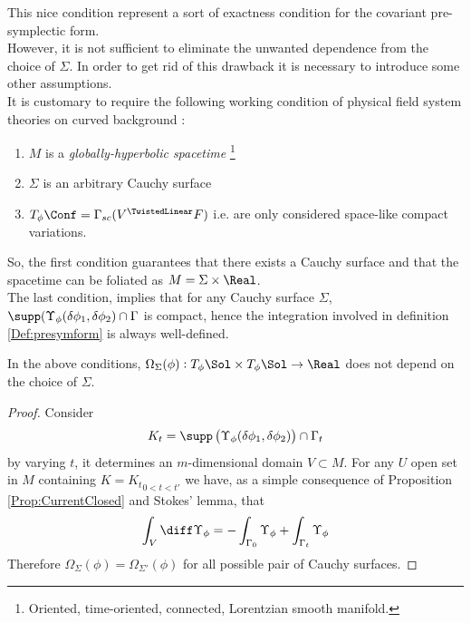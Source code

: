 \documentclass[a4paper,12pt,fleqn]{scrartcl}  %
\begin{document}
This nice condition represent a sort of exactness condition for the covariant pre-symplectic form.\\
However, it is not sufficient to eliminate the unwanted dependence from the choice of $\Sigma$.
In order to get rid of this drawback it is necessary to introduce some other assumptions.\\
It is customary to require the following working condition of physical field system theories on curved background
\cite{primer}:
\begin{enumerate}
	\item $M$ is a \emph{globally-hyperbolic spacetime}
	\footnote{Oriented, time-oriented, connected, Lorentzian smooth manifold. } 
	\item $\Sigma$ is an arbitrary Cauchy surface
	\item $T_\phi \Conf =\Gamma_{sc} (V^\TwistedLinear F )$ i.e. are only considered space-like compact variations.
\end{enumerate}
%
So, the first condition guarantees that there exists a Cauchy surface and that the spacetime can be foliated as $M= \Sigma \times \Real$.\\
The last condition, implies that for any Cauchy surface $\Sigma$, $ \supp(\Upsilon_\phi (\delta \phi_1, \delta \phi_2) \cap \Gamma$ is compact, hence the integration involved in definition \ref{Def:presymform} is always well-defined.

\begin{proposition}
	In the above conditions, $\Omega_\Sigma (\phi): T_\phi \Sol \times T_\phi \Sol \rightarrow \Real$ does not depend on the choice of $\Sigma$.
\end{proposition}
\begin{proof}
	Consider 
	\begin{displaymath}
		K_t = \supp\left(\Upsilon_\phi (\delta \phi_1, \delta \phi_2) \right) \cap \Gamma_t
	\end{displaymath}
	by varying $t$, it determines an $m$-dimensional domain $V \subset M$.
	For any $U$ open set in $M$ containing $K={K_t}_{0<t<t'}$ we have, as a simple consequence of Proposition \ref{Prop:CurrentClosed} and Stokes' lemma, that
	\begin{displaymath}
		\int_V \diff \Upsilon_\phi = - \int_{\Gamma_0} \Upsilon_\phi +\int_{\Gamma_t} \Upsilon_\phi 
	\end{displaymath}
	Therefore $\Omega_\Sigma (\phi) = \Omega_{\Sigma'} (\phi)$ for all possible pair of Cauchy surfaces.
\end{proof}
\end{document}
